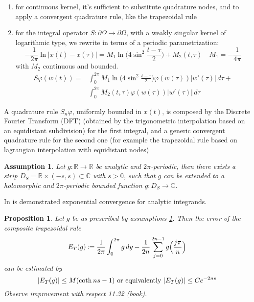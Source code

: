 \documentclass[10pt, a4paper, twoside, openright]{book}
\theoremstyle{definition}
\theoremstyle{plain}
\theoremstyle{plain}
\theoremstyle{plain}
\newtheorem{proposition}[subsection]{Proposition}
\theoremstyle{plain}
\theoremstyle{plain}
\theoremstyle{plain}
\theoremstyle{plain}
\newtheorem{assumption}[subsection]{Assumption}
\theoremstyle{plain}
\let\phi\varphi
\begin{document}
\begin{enumerate}
 \item for continuous kernel, it's sufficient to substitute quadrature nodes, and to apply a convergent quadrature rule, like the trapezoidal rule
 \item for the integral operator $S:\partial\Omega\to \partial\Omega$, with a weakly singular kernel of logarithmic type, we rewrite in terms of a periodic parametrization:
\begin{equation}
 -\frac{1}{2\pi}\ln|x(t)-x(\tau)|=M_1\ln\Big(4\sin^2\frac{t-\tau}{2}\Big)+M_2(t,\tau) \quad M_1 = -\frac{1}{4\pi}
\end{equation}
with $M_2$ continuous and bounded.
\begin{align}
 S\phi(w(t)) =  &\int_0^{2\pi} M_1\ln\Big(4\sin^2\frac{t-\tau}{2}\Big)\phi(w(\tau))|w'(\tau)|\,d\tau + \\ 
                &\int_0^{2\pi} M_2(t,\tau)\phi(w(\tau))|w'(\tau)|\,d\tau 
\end{align}
\end{enumerate}
A quadrature rule $S_n\phi$, uniformly bounded in $x(t)$, is composed by the Discrete Fourier Transform (DFT) (obtained by the trigonometric interpolation based on an equidistant subdivision) for the first integral, and a generic convergent quadrature rule for the second one (for example the trapezoidal rule based on lagrangian interpolation with equidistant nodes) 
\begin{assumption}
\label{assumption:holom-ext}
 Let $g:\mathbb{R}\to\mathbb{R}$ be analytic and $2\pi$-periodic, then there exists a strip $D_S=\mathbb{R}\times(-s, s)\subset\mathbb{C}$ with $s>0$, such that
 $g$ can be extended to a holomorphic and $2\pi$-periodic bounded function $g:D_S\to\mathbb{C}$.
\end{assumption}
In \cite{kress:book} is demonstrated exponential convergence for analytic integrands.
\begin{proposition}
 Let $g$ be as prescribed by assumptions \ref{assumption:holom-ext}. Then the error of the composite trapezoidal rule
 \begin{equation}
  E_T(g)\coloneqq \frac{1}{2\pi}\int_0^{2\pi}g\,dy - \frac{1}{2n}\sum_{j=0}^{2n-1}g\Bigl(\frac{j\pi}{n}\Bigr)
 \end{equation}
 can be estimated by 
 \begin{equation}
  |E_T(g)|\leq M(\coth ns -1) \textup{ or equivalently } |E_T(g)|\leq C e^{-2ns} 
 \end{equation}
Observe improvement with respect 11.32 (book).
\end{proposition}
\end{document}
